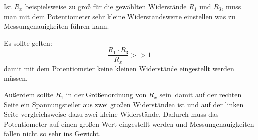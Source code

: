 \documentclass[10pt]{report}
\begin{document}
        \vspace{0.5cm}

        Ist $R_x$ beispielsweise zu groß für die gewählten Widerstände $R_1$ und $R_3$, muss
        man mit dem Potentiometer sehr kleine Widerstandswerte einstellen was zu
        Messungenauigkeiten führen kann.

        Es sollte gelten:
        \begin{equation*}
            \frac{R_1 \cdot R_3}{R_x} >> 1
        \end{equation*}
        damit mit dem Potentiometer keine kleinen Widerstände eingestellt werden
        müssen.

        Außerdem sollte $R_1$ in der Größenordnung von $R_x$ sein, damit auf der
        rechten Seite ein Spannungsteiler aus zwei großen Widerständen ist und auf
        der linken Seite vergleichsweise dazu zwei kleine Widerstände. Dadurch
        muss das Potentiometer auf einen großen Wert eingestellt werden und
        Messungenauigkeiten fallen nicht so sehr ins Gewicht.
\end{document}
